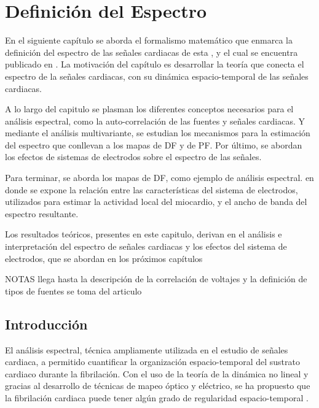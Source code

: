 \chapter{Definición  del Espectro}

\begin{resumen}

En el siguiente capítulo se aborda el formalismo matemático que enmarca la definición del espectro de las señales cardiacas de esta \nombreDoc, y el cual se encuentra publicado en \cite{Requena13b}. La motivación del capítulo es desarrollar la teoría que conecta el espectro de la señales cardiacas, con su dinámica espacio-temporal de las señales cardiacas.

A lo largo del capitulo se plasman los diferentes conceptos necesarios para el análisis espectral, como la auto-correlación de las fuentes y señales cardiacas. Y mediante el análisis multivariante, se estudian los mecanismos para la estimación del espectro que conllevan a los mapas de \acf{DF} y de \acf{PF}. Por último, se abordan los efectos de sistemas de electrodos sobre el espectro de las señales.

Para terminar, se aborda los mapas de \ac{DF}, como ejemplo de análisis espectral. en donde se expone la relación entre las características del sistema de electrodos, utilizados para estimar la actividad local del miocardio, y el ancho de banda del espectro resultante.

Los resultados teóricos, presentes en este capitulo, derivan en el análisis e
interpretación del espectro de señales cardiacas y los efectos del sistema
de electrodos, que se abordan en los próximos capítulos

NOTAS llega hasta la descripción de la correlación de voltajes  y la definición de tipos de fuentes se toma del articulo


\end{resumen}


\section{Introducción}


El análisis espectral, técnica ampliamente utilizada en el estudio de señales cardiaca, a permitido cuantificar la  organización espacio-temporal del sustrato cardiaco durante la fibrilación. Con el uso de la teoría de la dinámica no lineal y gracias al desarrollo de técnicas de mapeo óptico y eléctrico, se ha propuesto que la fibrilación cardiaca  puede tener algún grado de regularidad espacio-temporal \cite{Hoekstra95, Jalife00}.

